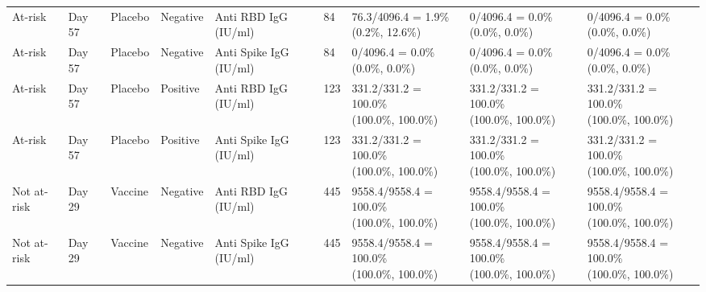 \documentclass[]{book}
\theoremstyle{definition}
\theoremstyle{definition}
\theoremstyle{definition}
\newcommand{\1}{\mathbbm{1}}
\begin{document}
\begin{landscape}
\begin{ThreePartTable}
\begin{longtable}[t]{>{\raggedright\arraybackslash}p{2.7cm}llllllll}
\hspace{1em}At-risk & Day 57 & Placebo & Negative & Anti RBD IgG (IU/ml) & 84 & \makecell[l]{76.3/4096.4 = 1.9\%\\(0.2\%, 12.6\%)} & \makecell[l]{0/4096.4 = 0.0\%\\(0.0\%, 0.0\%)} & \makecell[l]{0/4096.4 = 0.0\%\\(0.0\%, 0.0\%)}\\
\hspace{1em}At-risk & Day 57 & Placebo & Negative & Anti Spike IgG (IU/ml) & 84 & \makecell[l]{0/4096.4 = 0.0\%\\(0.0\%, 0.0\%)} & \makecell[l]{0/4096.4 = 0.0\%\\(0.0\%, 0.0\%)} & \makecell[l]{0/4096.4 = 0.0\%\\(0.0\%, 0.0\%)}\\
\hspace{1em}At-risk & Day 57 & Placebo & Positive & Anti RBD IgG (IU/ml) & 123 & \makecell[l]{331.2/331.2 = 100.0\%\\(100.0\%, 100.0\%)} & \makecell[l]{331.2/331.2 = 100.0\%\\(100.0\%, 100.0\%)} & \makecell[l]{331.2/331.2 = 100.0\%\\(100.0\%, 100.0\%)}\\
\hspace{1em}At-risk & Day 57 & Placebo & Positive & Anti Spike IgG (IU/ml) & 123 & \makecell[l]{331.2/331.2 = 100.0\%\\(100.0\%, 100.0\%)} & \makecell[l]{331.2/331.2 = 100.0\%\\(100.0\%, 100.0\%)} & \makecell[l]{331.2/331.2 = 100.0\%\\(100.0\%, 100.0\%)}\\
\hspace{1em}Not at-risk & Day 29 & Vaccine & Negative & Anti RBD IgG (IU/ml) & 445 & \makecell[l]{9558.4/9558.4 = 100.0\%\\(100.0\%, 100.0\%)} & \makecell[l]{9558.4/9558.4 = 100.0\%\\(100.0\%, 100.0\%)} & \makecell[l]{9558.4/9558.4 = 100.0\%\\(100.0\%, 100.0\%)}\\
\hspace{1em}Not at-risk & Day 29 & Vaccine & Negative & Anti Spike IgG (IU/ml) & 445 & \makecell[l]{9558.4/9558.4 = 100.0\%\\(100.0\%, 100.0\%)} & \makecell[l]{9558.4/9558.4 = 100.0\%\\(100.0\%, 100.0\%)} & \makecell[l]{9558.4/9558.4 = 100.0\%\\(100.0\%, 100.0\%)}\\

\end{longtable}
\end{ThreePartTable}
\end{landscape}
\end{document}
